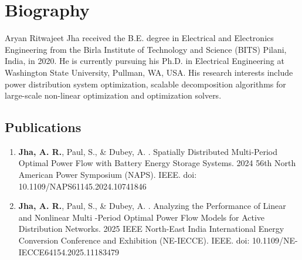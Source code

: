 \section{Biography}
\small
Aryan Ritwajeet Jha received the B.E. degree in Electrical and Electronics Engineering from the Birla Institute of Technology and Science (BITS) Pilani, India, in 2020. He is currently pursuing his Ph.D. in Electrical Engineering at Washington State University, Pullman, WA, USA. His research interests include power distribution system optimization, scalable decomposition algorithms for large-scale non-linear optimization and optimization solvers.
\singlespacing

\subsection{Publications}
\small
\begin{enumerate}
    \item \textbf{Jha, A. R.}, Paul, S., \& Dubey, A. . Spatially Distributed Multi-Period Optimal Power Flow with Battery Energy Storage Systems. 2024 56th North American Power Symposium (NAPS). IEEE. doi: 10.1109/NAPS61145.2024.10741846 \cite{Jha2024}
    \item \textbf{Jha, A. R.}, Paul, S., \& Dubey, A. . Analyzing the Performance of Linear and Nonlinear Multi -Period Optimal Power Flow Models for Active Distribution Networks. 2025 IEEE North-East India International Energy Conversion Conference and Exhibition (NE-IECCE). IEEE. doi: 10.1109/NE-IECCE64154.2025.11183479 \cite{Jha2025}
\end{enumerate}


\clearpage
